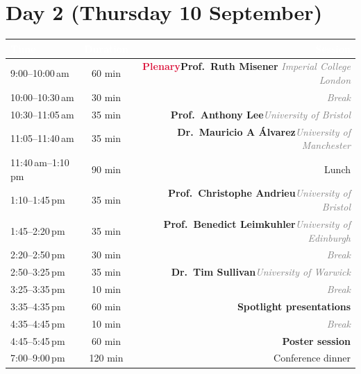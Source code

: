 \documentclass[11pt]{article}
\newcommand{\talk}[2]{\textbf{#1}\hfill\textcolor{graytext}{\textit{#2}}}
\newcommand{\plenary}[2]{\textbf{\textcolor{crimson}{Plenary}}\quad\textbf{#1}%
  \hfill\textcolor{graytext}{\textit{#2}}}
\newcommand{\brk}{\textcolor{graytext}{\itshape Break}}
\newcommand{\headrow}{%
  \rowcolor{crimson}
  \textcolor{white}{\textbf{Time}} &
  \textcolor{white}{\textbf{Duration}} &
  \textcolor{white}{\textbf{Session}} \\}
\begin{document}
\section*{\color{crimson}Day 2 \normalfont\small(Thursday 10 September)}
\vspace{-0.4em}
\begin{tabularx}{\linewidth}{L C R}
\headrow
\midrule
{}
9:00--10:00\,am  & 60 min  & \plenary{Prof.\ Ruth Misener}{Imperial College London} \\
10:00--10:30\,am & 30 min  & \brk \\
10:30--11:05\,am & 35 min  & \talk{Prof.\ Anthony Lee}{University of Bristol} \\
11:05--11:40\,am & 35 min  & \talk{Dr.\ Mauricio A \'Alvarez}{University of Manchester} \\
11:40\,am--1:10\,pm & 90 min & Lunch \\
1:10--1:45\,pm   & 35 min  & \talk{Prof.\ Christophe Andrieu}{University of Bristol} \\
1:45--2:20\,pm   & 35 min  & \talk{Prof.\ Benedict Leimkuhler}{University of Edinburgh} \\
2:20--2:50\,pm   & 30 min  & \brk \\
2:50--3:25\,pm   & 35 min  & \talk{Dr.\ Tim Sullivan}{University of Warwick} \\
3:25--3:35\,pm   & 10 min  & \brk \\
3:35--4:35\,pm   & 60 min  & \textbf{Spotlight presentations} \\
4:35--4:45\,pm   & 10 min  & \brk \\
4:45--5:45\,pm   & 60 min  & \textbf{Poster session} \\
7:00--9:00\,pm   & 120 min & Conference dinner \\
\bottomrule
\end{tabularx}

\end{document}
